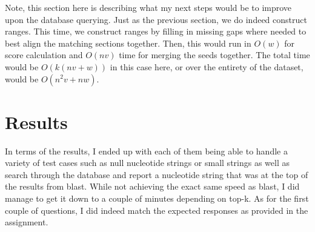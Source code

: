 \documentclass[10pt]{article}
\begin{document}
Note, this section here is describing what my next steps would be to improve upon the database querying. Just as the previous section, we do indeed construct ranges. This time, we construct ranges by filling in missing gaps where needed to best align the matching sections together. Then, this would run in $O(w)$ for score calculation and $O(nv)$ time for merging the seeds together. The total time would be $O(k(nv + w))$ in this case here, or over the entirety of the dataset, would be $O(n^2v + nw)$.

\newpage
\section*{Results}
In terms of the results, I ended up with each of them being able to handle a variety of test cases such as null nucleotide strings or small strings as well as search through the database and report a nucleotide string that was at the top of the results from blast. While not achieving the exact same speed as blast, I did manage to get it down to a couple of minutes depending on top-k. As for the first couple of questions, I did indeed match the expected responses as provided in the assignment.
\end{document}
